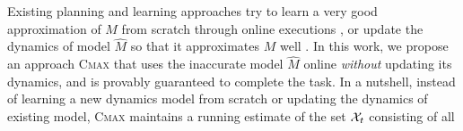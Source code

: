 Existing planning and learning approaches try to learn a very good
approximation of $M$ from scratch 
through online executions \cite{DBLP:journals/ml/KearnsS02, DBLP:journals/jmlr/BrafmanT02, DBLP:conf/atal/JongS07,
  DBLP:journals/pami/DeisenrothFR15}, or update the dynamics of model
$\hat{M}$ so that it approximates $M$ well \cite{DBLP:conf/icml/AbbeelQN06,
  DBLP:conf/aaai/Jiang18, rastogi2018sample}.
In this work, we propose an approach \textsc{Cmax} that uses
the inaccurate model $\hat{M}$ online \emph{without} updating its dynamics, and
is provably guaranteed to complete the task.
In a nutshell, instead of learning a new dynamics model from scratch or
updating the dynamics of existing model,
\textsc{Cmax}
maintains a
running estimate of the set $\mathcal{X}_t$ consisting of all
